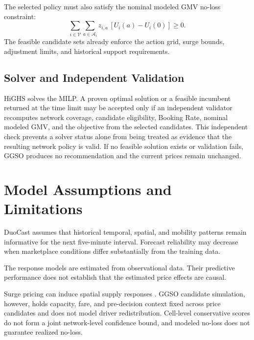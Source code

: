 \documentclass[a4paper,10pt,twocolumn]{article}
\newcommand{\Vset}{\mathcal V}
\begin{document}
The selected policy must also satisfy the nominal modeled GMV no-loss
constraint:
\begin{equation}
 \sum_{i\in\Vset}\sum_{a\in\mathcal A_i}
 z_{i,a}\,[U_i(a)-U_i(0)]\ge0.
 \label{eq:noloss}
\end{equation}
The feasible candidate sets already enforce the action grid, surge bounds,
adjustment limits, and historical support requirements.

\subsection{Solver and Independent Validation}
HiGHS solves the MILP. A proven optimal solution or a feasible incumbent
returned at the time limit may be accepted only if an independent validator
recomputes network coverage, candidate eligibility, Booking Rate, nominal
modeled GMV, and the objective from the selected candidates. This independent
check prevents a solver status alone from being treated as evidence that the
resulting network policy is valid. If no feasible solution exists or validation
fails, GGSO produces no recommendation and the current prices remain unchanged.

\section{Model Assumptions and Limitations}\label{app:limitations}
DuoCast assumes that historical temporal, spatial, and mobility patterns
remain informative for the next five-minute interval. Forecast reliability
may decrease when marketplace conditions differ substantially from the
training data.

The response models are estimated from observational data. Their predictive
performance does not establish that the estimated price effects are causal.

Surge pricing can induce spatial supply responses \cite{besbes2021}. GGSO
candidate simulation, however, holds capacity, fare, and pre-decision context
fixed across price candidates and does not model driver redistribution.
Cell-level conservative scores do not form a joint network-level confidence
bound, and modeled no-loss does not guarantee realized no-loss.
\end{document}
